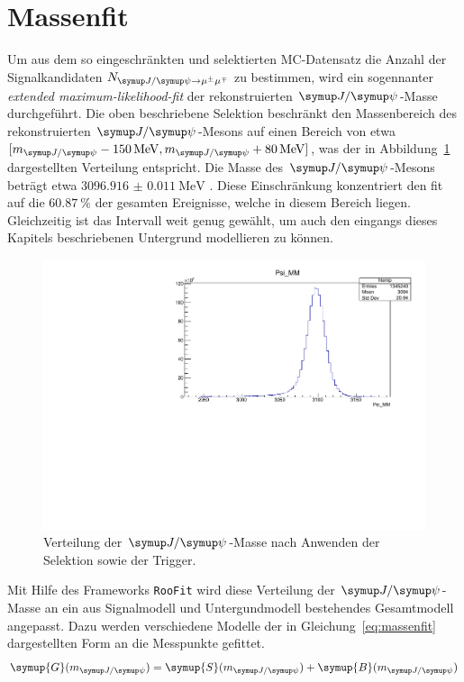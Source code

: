 \section{Massenfit}
%
Um aus dem so eingeschränkten und selektierten MC-Datensatz die Anzahl der Signalkandidaten $N_{\kontroll}$ zu bestimmen, wird ein sogennanter \textit{extended maximum-likelihood-fit} \cite{extended} der rekonstruierten $\jpsi$-Masse durchgeführt. Die oben
beschriebene Selektion beschränkt den Massenbereich des rekonstruierten $\jpsi$-Mesons auf einen Bereich von etwa
$[m_{\jpsi}-\SI{150}{\mega\electronvolt}, m_{\jpsi}+\SI{80}{\mega\electronvolt}]$, was der in Abbildung~\ref{fig:mass} dargestellten Verteilung entspricht. Die Masse des $\jpsi$-Mesons beträgt etwa $\SI{3096.916(11)}{\mega\electronvolt}$ \cite{pdg}. Diese Einschränkung konzentriert den fit auf die $\SI{60.87}{\percent}$ der gesamten Ereignisse, welche in diesem Bereich liegen. Gleichzeitig ist das Intervall weit genug gewählt, um auch den eingangs dieses Kapitels beschriebenen Untergrund modellieren zu können.
%
\begin{figure}[H]
  \centering
      \includegraphics[width=\textwidth]{Plots/jpsi_mass.pdf}
  \caption{Verteilung der $\jpsi$-Masse nach Anwenden der Selektion sowie der Trigger.}
  \label{fig:mass}
\end{figure}
%
Mit Hilfe des Frameworks \texttt{RooFit} \cite{roofit} wird diese Verteilung der $\jpsi$-Masse an ein aus Signalmodell und Untergundmodell bestehendes Gesamtmodell angepasst. Dazu werden verschiedene Modelle der in Gleichung~\ref{eq:massenfit} dargestellten Form an die Messpunkte gefittet.
%
\begin{equation}
  \symup{G}(m_{\jpsi})= \symup{S}(m_{\jpsi}) + \symup{B}(m_{\jpsi})
  \label{eq:massenfit}
\end{equation}
